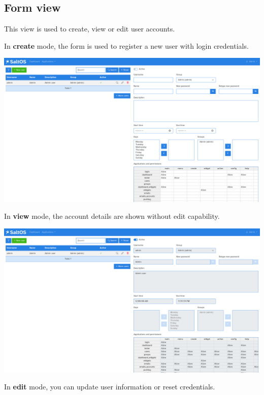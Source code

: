 \documentclass[a4paper]{article}
\begin{document}
\hypertarget{toc184}{}
\subsection{Form view}

This view is used to create, view or edit user accounts.

In \textbf{create} mode, the form is used to register a new user with login credentials.

\begin{center}\includegraphics[width=1\textwidth]{../ujest/snaps/test-screenshots-js-screenshots-users-users-create-en-us-1-snap.png}\end{center}

In \textbf{view} mode, the account details are shown without edit capability.

\begin{center}\includegraphics[width=1\textwidth]{../ujest/snaps/test-screenshots-js-screenshots-users-users-view-1-en-us-1-snap.png}\end{center}

In \textbf{edit} mode, you can update user information or reset credentials.
\end{document}
